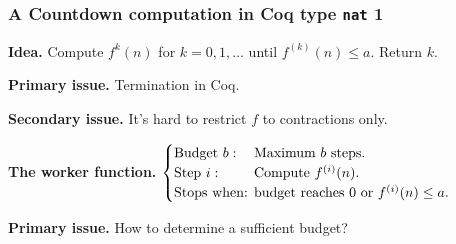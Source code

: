 \begin{frame}[fragile]
\frametitle{A Countdown computation in Coq type \texttt{nat} 1}
\textbf{Idea.} %
Compute $f^{k}(n)$ for $k=0, 1,\ldots$ until $f^{(k)}(n)\le a$. Return $k$.

\bigskip

\textbf{Primary issue.} Termination in Coq.

\bigskip

\textbf{Secondary issue.} It's hard to restrict $f$ to contractions only.

\bigskip

\textbf{The worker function.} $\begin{cases}
\text{Budget } b: & \hspace{-1em}\text{Maximum } b \text{ steps. } \\
\text{Step } i: & \hspace{-1em}\text{Compute } f^{(i)}(n). \\
\text{Stops when: } & \hspace{-1em}\text{budget reaches } 0 \text{ or } f^{(i)}(n) \le a.
\end{cases}$


\bigskip

\textbf{Primary issue.} How to determine a sufficient budget?
\end{frame}


